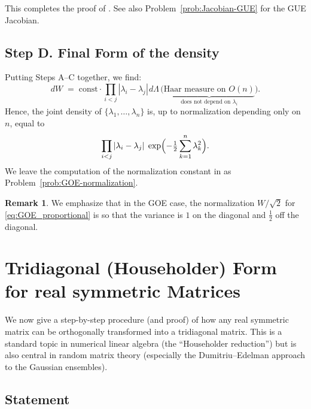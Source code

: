 \documentclass[letterpaper,11pt,oneside,reqno]{article}
\numberwithin{equation}{section}
\newcommand{\ssp}{\hspace{1pt}}
\theoremstyle{definition}
\newtheorem{remark}[proposition]{Remark}
\begin{document}
This completes the proof of 
.
See also Problem~\ref{prob:Jacobian-GUE} for the GUE Jacobian.

\subsection{Step D. Final Form of the density}
\label{subsec:final-form}

Putting Steps A--C together, we find:
\[
  dW
  \;=\;
	\mathrm{const}\cdot
  \prod_{i<j}|\lambda_i-\lambda_j|\ssp
  d\Lambda
  \,\bigl(\underbrace{\text{Haar measure on }O(n)}_{\text{does not depend on }\lambda_i}\bigr).
\]
Hence, the joint density of \(\{\lambda_1,\dots,\lambda_n\}\) is,
up to normalization depending only on \(n\), equal to
\begin{equation}
	\label{eq:GOE_proportional}
  \prod_{i<j}|\lambda_i-\lambda_j|\;
  \exp\Bigl(-\tfrac{1}{2}\sum_{k=1}^n \lambda_k^2\Bigr).
\end{equation}
We leave the computation of the normalization constant in
 as Problem~\ref{prob:GOE-normalization}.

\begin{remark}
	We emphasize that in the GOE case, the normalization $W/\sqrt 2$ for 
	\eqref{eq:GOE_proportional} 
	is so that the variance is $1$ on the diagonal and 
	$\frac{1}{2}$ off the diagonal. 
\end{remark}


\section{Tridiagonal (Householder) Form for real symmetric Matrices}
\label{sec:householder}

We now give a step-by-step procedure (and proof) of how any real symmetric matrix can be orthogonally transformed into a tridiagonal matrix. This is a standard topic in numerical linear algebra (the “Householder reduction”) but is also central in random matrix theory (especially the Dumitriu–Edelman approach to the Gaussian ensembles).

\subsection{Statement}
\end{document}
